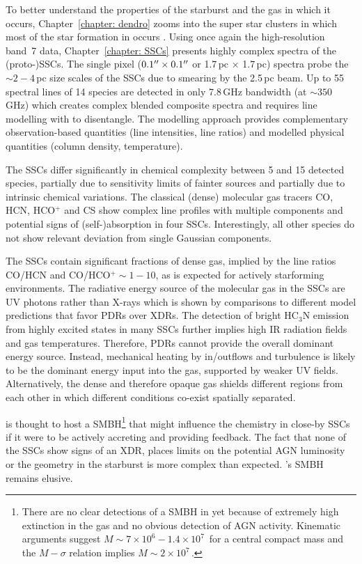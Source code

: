 To better understand the properties of the starburst and the gas in which it occurs, Chapter~\ref{chapter: dendro} zooms into the super star clusters in which most of the star formation in  occurs \citep[up to 100\% of the starburst SFR;][]{2018ApJ...869..126L}.
Using once again the high-resolution band~7 data, Chapter~\ref{chapter: SSCs} presents highly complex spectra of the (proto-)SSCs. 
The single pixel ($0.1^{\prime\prime} \times 0.1^{\prime\prime}$ or 1.7\,pc $\times$ 1.7\,pc) spectra probe the $\sim 2-4$\,pc size scales of the SSCs due to smearing by the 2.5\,pc beam.
Up to 55 spectral lines of 14 species are detected in only 7.8\,GHz bandwidth (at $\sim 350$\,GHz) which creates complex blended composite spectra and requires line modelling with \xclass to disentangle. The modelling approach provides complementary observation-based quantities (line intensities, line ratios) and modelled physical quantities (column density, temperature).

The SSCs differ significantly in chemical complexity between 5 and 15 detected species, partially due to sensitivity limits of fainter sources and partially due to intrinsic chemical variations.
The classical (dense) molecular gas tracers CO, HCN, HCO$^+$ and CS show complex line profiles with multiple components and potential signs of (self-)absorption in four SSCs. Interestingly, all other species do not show relevant deviation from single Gaussian components.

The SSCs contain significant fractions of dense gas, implied by the line ratios CO/HCN and CO/HCO$^+ \sim 1-10$, as is expected for actively starforming environments.
The radiative energy source of the molecular gas in the SSCs are UV photons rather than X-rays which is shown by comparisons to different model predictions that favor PDRs over XDRs. 
The detection of bright HC$_3$N emission from highly excited states in many SSCs further implies high IR radiation fields and gas temperatures.
Therefore, PDRs cannot provide the overall dominant energy source. Instead, mechanical heating by in/outflows and turbulence is likely to be the dominant energy input into the gas, supported by weaker UV fields. 
Alternatively, the dense and therefore opaque gas shields different regions from each other in which different conditions co-exist spatially separated.

 is thought to host a SMBH\footnote{There are no clear detections of a SMBH in  yet because of extremely high extinction in the gas and no obvious detection of AGN activity. Kinematic arguments suggest $M \sim 7\times10^6 - 1.4\times10^7$\,\Msun \citep{2006ApJ...644..914R,2020MNRAS.tmp..289C} for a central compact mass and the $M-\sigma$ relation implies $M \sim 2\times10^7$\,\Msun \citep{2019A&A...623A..79C}.} that might influence the chemistry in close-by SSCs if it were to be actively accreting and providing feedback. The fact that none of the SSCs show signs of an XDR, places limits on the potential AGN luminosity or the geometry in the starburst is more complex than expected. 's SMBH remains elusive.

